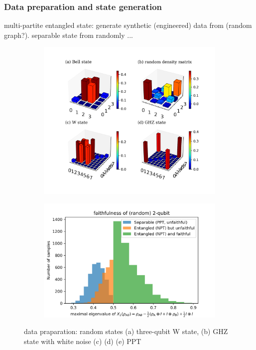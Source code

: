 \documentclass[
reprint,
aps,
pra,
]{revtex4-2}
\theoremstyle{plain}
\theoremstyle{definition}
\begin{document}
\subsubsection{Data preparation and state generation}
multi-partite entangled state: generate synthetic (engineered) data from (random graph?).
separable state from randomly ...
\begin{figure}[!ht]
	\centering
	\begin{subfigure}{0.45\textwidth}
	\centering
		\includegraphics[width=.9\linewidth]{./Code/dataset_sample.png}
	\end{subfigure}
	\begin{subfigure}{0.5\textwidth}
		\centering
			\includegraphics[width=.9\linewidth]{./Code/faithfulness_2_qubit.png}
		\end{subfigure}
	\caption{data praparation: random states (a) three-qubit W state, (b) GHZ state with white noise (c) (d) (e) PPT}
\end{figure}
\end{document}
